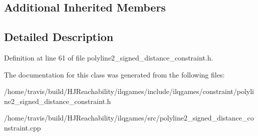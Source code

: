 \subsection*{Additional Inherited Members}


\subsection{Detailed Description}


Definition at line 61 of file polyline2\+\_\+signed\+\_\+distance\+\_\+constraint.\+h.



The documentation for this class was generated from the following files\+:\begin{DoxyCompactItemize}
\item 
/home/travis/build/\+H\+J\+Reachability/ilqgames/include/ilqgames/constraint/polyline2\+\_\+signed\+\_\+distance\+\_\+constraint.\+h\item 
/home/travis/build/\+H\+J\+Reachability/ilqgames/src/polyline2\+\_\+signed\+\_\+distance\+\_\+constraint.\+cpp\end{DoxyCompactItemize}
